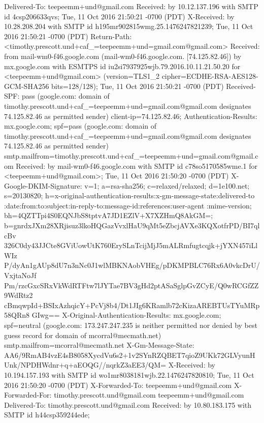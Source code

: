 \begin{itemize}
\begin{itemize}
Delivered-To: teepeemm+und@gmail.com
Received: by 10.12.137.196 with SMTP id 4csp206633qvs;
        Tue, 11 Oct 2016 21:50:21 -0700 (PDT)
X-Received: by 10.28.208.204 with SMTP id h195mr902815wmg.25.1476247821239;
        Tue, 11 Oct 2016 21:50:21 -0700 (PDT)
Return-Path: <timothy.prescott.und+caf_=teepeemm+und=gmail.com@gmail.com>
Received: from mail-wm0-f46.google.com (mail-wm0-f46.google.com. [74.125.82.46])
        by mx.google.com with ESMTPS id iu2si7937925wjb.79.2016.10.11.21.50.20
        for <teepeemm+und@gmail.com>
        (version=TLS1_2 cipher=ECDHE-RSA-AES128-GCM-SHA256 bits=128/128);
        Tue, 11 Oct 2016 21:50:21 -0700 (PDT)
Received-SPF: pass (google.com: domain of timothy.prescott.und+caf_=teepeemm+und=gmail.com@gmail.com designates 74.125.82.46 as permitted sender) client-ip=74.125.82.46;
Authentication-Results: mx.google.com;
       spf=pass (google.com: domain of timothy.prescott.und+caf_=teepeemm+und=gmail.com@gmail.com designates 74.125.82.46 as permitted sender) smtp.mailfrom=timothy.prescott.und+caf_=teepeemm+und=gmail.com@gmail.com
Received: by mail-wm0-f46.google.com with SMTP id c78so5170585wme.1
        for <teepeemm+und@gmail.com>; Tue, 11 Oct 2016 21:50:20 -0700 (PDT)
X-Google-DKIM-Signature: v=1; a=rsa-sha256; c=relaxed/relaxed;
        d=1e100.net; s=20130820;
        h=x-original-authentication-results:x-gm-message-state:delivered-to
         :date:from:to:subject:in-reply-to:message-id:references:user-agent
         :mime-version;
        bh=4QZTTpi4S0EQNJbS8tptvA7JD1EZlV+X7XZHmQ8AkGM=;
        b=gnrdxJXm28XRjisuz3lkoHQGazVvxlHaU9qMt5eZbcjAVXe3KQXotfrPD/BI7qlcBv
         326C0dy43JJCte8GViUowUtK760ErySLnTcijMjJ5mALRmfugtcqjk+jYXN457iLlWIz
         P/dyAn1gAUp8dU7n3nNc0J1wlMBKNAobVHEg/pDKMPBLC76Rx6A0vkcDrU/VxjtaNoJf
         Pm/rzcGxcSRxVkWdRTFtw7lJYTae7BV3gHd2ptASaSglpGvZCyE/Q0wRCGfZZ9WdRtz2
         cBmqwpId+BSIxAzhqicY+PcVj8b4/Dt1JIg6KRamlb72cKizaAREBTUsTYuMRp58QRn8
         GIwg==
X-Original-Authentication-Results: mx.google.com;
       spf=neutral (google.com: 173.247.247.235 is neither permitted nor denied by best guess record for domain of mcorral@mecmath.net) smtp.mailfrom=mcorral@mecmath.net
X-Gm-Message-State: AA6/9RmAB4vzE4sB8058XycdVu6s2+1v2SYnRZQBET7qioZ9UKk72GLVyunHUnk/NPDHWdnr+q+aEOQG//nqrkZ3aEE3/QM=
X-Received: by 10.194.157.193 with SMTP id wo1mr8038181wjb.22.1476247820810;
        Tue, 11 Oct 2016 21:50:20 -0700 (PDT)
X-Forwarded-To: teepeemm+und@gmail.com
X-Forwarded-For: timothy.prescott.und@gmail.com teepeemm+und@gmail.com
Delivered-To: timothy.prescott.und@gmail.com
Received: by 10.80.183.175 with SMTP id h44csp359244ede;

\end{itemize}
\end{itemize}
